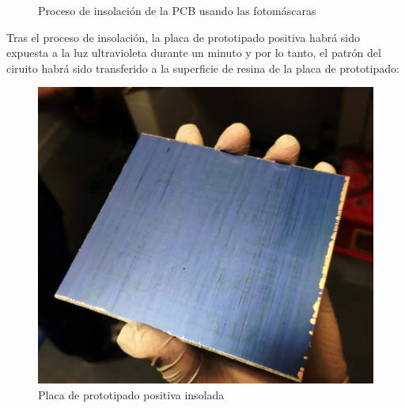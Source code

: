 \begin{itemize}
    \begin{figure}[H]
    \centering
    \caption{Proceso de insolación de la \ac{PCB} usando las fotomáscaras} \label{fig:lego}
    \end{figure}
    
    Tras el proceso de insolación, la placa de prototipado positiva habrá sido expuesta a la luz ultravioleta durante un minuto y por lo tanto, el patrón del ciruito habrá sido transferido a la superficie de resina de la placa de prototipado:
    
    \begin{figure}[H]
    \centering 
    \includegraphics[width=0.5\linewidth]{pictures/PCBisolada.jpg}
    \caption{Placa de prototipado positiva insolada}
    \label{fig:kdiagram}
    \end{figure}
    

\end{itemize}

